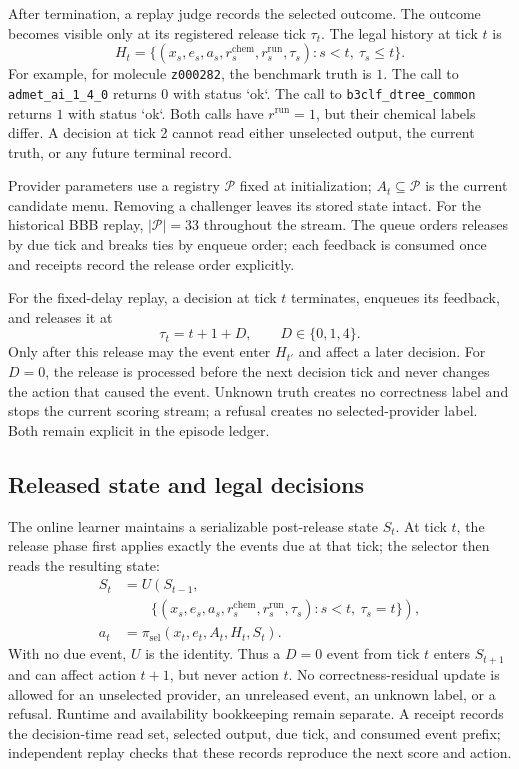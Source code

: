 \documentclass[sigconf,anonymous]{aamas}
\begin{document}
After termination, a replay judge records the selected outcome. The outcome becomes visible only at its registered release tick $\tau_t$. The legal history at tick $t$ is
$$
H_t=\{(x_s,e_s,a_s,r_s^{\mathrm{chem}},r_s^{\mathrm{run}},\tau_s):s<t,\ \tau_s\leq t\}.
$$
For example, for molecule \texttt{z000282}, the benchmark truth is $1$. The call to \texttt{admet\_ai\_1\_4\_0} returns $0$ with status `ok`. The call to \texttt{b3clf\_dtree\_common} returns $1$ with status `ok`. Both calls have $r^{\mathrm{run}}=1$, but their chemical labels differ. A decision at tick 2 cannot read either unselected output, the current truth, or any future terminal record.

Provider parameters use a registry $\mathcal P$ fixed at initialization; $A_t\subseteq\mathcal P$ is the current candidate menu. Removing a challenger leaves its stored state intact. For the historical BBB replay, $|\mathcal P|=33$ throughout the stream. The queue orders releases by due tick and breaks ties by enqueue order; each feedback is consumed once and receipts record the release order explicitly.

For the fixed-delay replay, a decision at tick $t$ terminates, enqueues its feedback, and releases it at
$$
\tau_t=t+1+D,\qquad D\in\{0,1,4\}.
$$
Only after this release may the event enter $H_{t'}$ and affect a later decision. For $D=0$, the release is processed before the next decision tick and never changes the action that caused the event. Unknown truth creates no correctness label and stops the current scoring stream; a refusal creates no selected-provider label. Both remain explicit in the episode ledger.

\subsection{Released state and legal decisions}
The online learner maintains a serializable post-release state $S_t$. At tick $t$, the release phase first applies exactly the events due at that tick; the selector then reads the resulting state:
$$
\begin{aligned}
S_t&=U\left(S_{t-1},\right.\\[-2pt]
&\qquad\left.\{(x_s,e_s,a_s,r_s^{\mathrm{chem}},r_s^{\mathrm{run}},\tau_s):s<t,\ \tau_s=t\}\right),\\
a_t&=\pi_{\mathrm{sel}}(x_t,e_t,A_t,H_t,S_t).
\end{aligned}
$$
With no due event, $U$ is the identity. Thus a $D=0$ event from tick $t$ enters $S_{t+1}$ and can affect action $t+1$, but never action $t$.
No correctness-residual update is allowed for an unselected provider, an unreleased event, an unknown label, or a refusal. Runtime and availability bookkeeping remain separate. A receipt records the decision-time read set, selected output, due tick, and consumed event prefix; independent replay checks that these records reproduce the next score and action.
\end{document}

